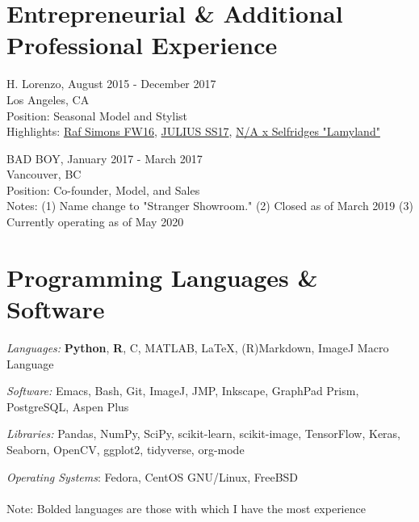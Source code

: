 \documentclass[letterpaper]{article}
\renewenvironment{itemize}{
  \begin{list}{}{
    \setlength{\leftmargin}{1.5em}
  }
}{
  \end{list}
}
\begin{document}
\section*{\textbf{Entrepreneurial \& Additional Professional Experience}}

\begin{itemize}
\item H. Lorenzo, August 2015 - December 2017
\\Los Angeles, CA
\\Position: Seasonal Model and Stylist
\\Highlights: \href{https://www.highsnobiety.com/2016/09/10/raf-simons-fw16-collection-h-lorenzo-editorial/}{Raf Simons FW16}, \href{https://hypebeast.com/2017/12/julius-spring-summer-2018-collection-h-lorenzo-pop-up}{JULIUS SS17}, \href{https://hypebeast.com/2018/1/not-applicable-selfridges-michele-lamy}{N/A x Selfridges "Lamyland"}
\item BAD BOY, January 2017 - March 2017
\\Vancouver, BC
\\Position: Co-founder, Model, and Sales
\\{\tiny Notes: (1) Name change to "Stranger Showroom." (2) Closed as of March 2019 (3) Currently operating as of May 2020}
\end{itemize}


\section*{\textbf{Programming Languages \& Software}}
\begin{itemize}
    \item \textit{Languages:} \textbf{Python}, \textbf{R}, C, MATLAB, \LaTeX, (R)Markdown, ImageJ Macro Language
    \item \textit{Software:} Emacs, Bash, Git, ImageJ, JMP, Inkscape, GraphPad Prism, PostgreSQL, Aspen Plus
    \item \textit{Libraries:} Pandas, NumPy, SciPy, scikit-learn, scikit-image, TensorFlow, Keras, Seaborn, OpenCV, ggplot2, tidyverse, org-mode
    \item \textit{Operating Systems}: Fedora, CentOS GNU/Linux, FreeBSD\\\\
    \tiny{Note: Bolded languages are those with which I have the most experience}
\end{itemize}
\end{document}
